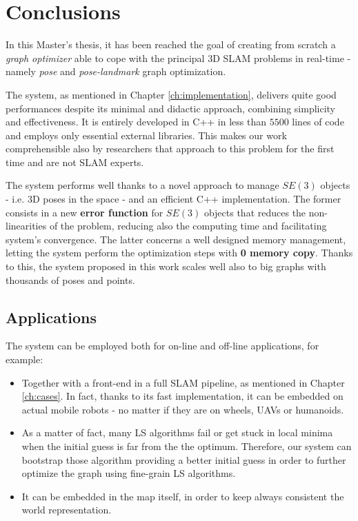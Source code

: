 \chapter{Conclusions}\label{ch:conclusions}
In this Master's thesis, it has been reached the goal of creating from scratch a \textit{graph optimizer} able to cope with the principal 3D SLAM problems in real-time - namely \textit{pose} and \textit{pose-landmark} graph optimization.

The system, as mentioned in Chapter \ref{ch:implementation}, delivers quite good performances despite its minimal and didactic approach, combining simplicity and effectiveness. It is entirely developed in C++ in less than $5500$ lines of code and employs only essential external libraries. This makes our work comprehensible also by researchers that approach to this problem for the first time and are not SLAM experts.

The system performs well thanks to a novel approach to manage $SE(3)$ objects - i.e. 3D poses in the space - and an efficient C++ implementation. The former consists in a new \textbf{error function} for $SE(3)$ objects that reduces the non-linearities of the problem, reducing also the computing time and facilitating system's convergence. The latter concerns a well designed memory management, letting the system perform the optimization steps with \textbf{0 memory copy}. Thanks to this, the system proposed in this work scales well also to big graphs with thousands of poses and points.

\section{Applications}\label{sec:conclusion_application}
The system can be employed both for on-line and off-line applications, for example:

\begin{itemize}
    \item Together with a front-end in a full SLAM pipeline, as mentioned in Chapter \ref{ch:cases}. In fact, thanks to its fast implementation, it can be embedded on actual mobile robots - no matter if they are on wheels, UAVs or humanoids.
    \item As a matter of fact, many LS algorithms fail or get stuck in local minima when the initial guess is far from the the optimum. Therefore, our system can bootstrap those algorithm providing a better initial guess in order to further optimize the graph using fine-grain LS algorithms.
    \item It can be embedded in the map itself, in order to keep always consistent the world representation.
\end{itemize}

